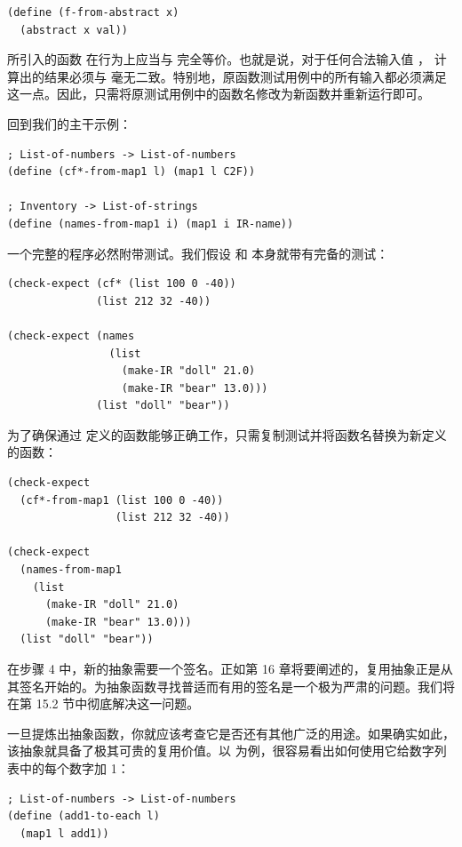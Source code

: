 \begin{lstlisting}[language=BSL]
(define (f-from-abstract x)
  (abstract x val))
\end{lstlisting}

所引入的函数  在行为上应当与  完全等价。也就是说，对于任何合法输入值 ， 计算出的结果必须与  毫无二致。特别地，原函数测试用例中的所有输入都必须满足这一点。因此，只需将原测试用例中的函数名修改为新函数并重新运行即可。

回到我们的主干示例：

\begin{lstlisting}[language=BSL]
; List-of-numbers -> List-of-numbers
(define (cf*-from-map1 l) (map1 l C2F))

; Inventory -> List-of-strings
(define (names-from-map1 i) (map1 i IR-name))
\end{lstlisting}

一个完整的程序必然附带测试。我们假设  和  本身就带有完备的测试：

\begin{lstlisting}[language=BSL]
(check-expect (cf* (list 100 0 -40))
              (list 212 32 -40))

(check-expect (names
                (list
                  (make-IR "doll" 21.0)
                  (make-IR "bear" 13.0)))
              (list "doll" "bear"))
\end{lstlisting}

为了确保通过  定义的函数能够正确工作，只需复制测试并将函数名替换为新定义的函数：

\begin{lstlisting}[language=BSL]
(check-expect
  (cf*-from-map1 (list 100 0 -40))
                 (list 212 32 -40))

(check-expect
  (names-from-map1
    (list
      (make-IR "doll" 21.0)
      (make-IR "bear" 13.0)))
  (list "doll" "bear"))
\end{lstlisting}

在步骤 4 中，新的抽象需要一个签名。正如第 16 章将要阐述的，复用抽象正是从其签名开始的。为抽象函数寻找普适而有用的签名是一个极为严肃的问题。我们将在第 15.2 节中彻底解决这一问题。

一旦提炼出抽象函数，你就应该考查它是否还有其他广泛的用途。如果确实如此，该抽象就具备了极其可贵的复用价值。以  为例，很容易看出如何使用它给数字列表中的每个数字加 1：

\begin{lstlisting}[language=BSL]
; List-of-numbers -> List-of-numbers
(define (add1-to-each l)
  (map1 l add1))
\end{lstlisting}


